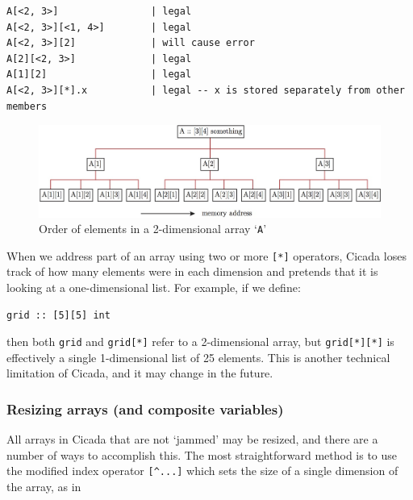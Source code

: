 \documentclass{article}
\newenvironment{code}{
       \begin{list}{}{
               \setlength{\leftmargin}{.4in}
               \setlength{\rightmargin}{0in}
               \setlength{\topsep}{.2in}
       }
       \small
       \item[] }
       { \end{list}   }
\begin{document}
\begin{code} \begin{verbatim}
A[<2, 3>]                | legal
A[<2, 3>][<1, 4>]        | legal
A[<2, 3>][2]             | will cause error
A[2][<2, 3>]             | legal
A[1][2]                  | legal
A[<2, 3>][*].x           | legal -- x is stored separately from other members
\end{verbatim} \end{code}

\begin{figure}
\centering
\includegraphics[width=\textwidth]{arrays}
\caption{Order of elements in a 2-dimensional array `\texttt{A}'}
\label{arrayElementOrder}
\end{figure}

When we address part of an array using two or more \verb#[*]# operators, Cicada loses track of how many elements were in each dimension and pretends that it is looking at a one-dimensional list.  For example, if we define:

\begin{code} \begin{verbatim}
grid :: [5][5] int
\end{verbatim} \end{code}

\noindent then both \verb#grid# and \verb#grid[*]# refer to a 2-dimensional array, but \verb#grid[*][*]# is effectively a single 1-dimensional list of 25 elements.  This is another technical limitation of Cicada, and it may change in the future.



\subsubsection{Resizing arrays (and composite variables)} 

All arrays in Cicada that are not `jammed' may be resized, and there are a number of ways to accomplish this.  The most straightforward method is to use the modified index operator \verb#[^...]# which sets the size of a single dimension of the array, as in
\end{document}
